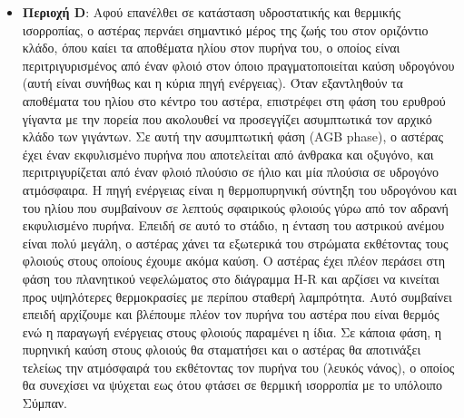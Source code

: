 \begin{itemize}
    \item \textbf{Περιοχή D}: Αφού επανέλθει σε κατάσταση υδροστατικής και θερμικής ισορροπίας, ο αστέρας περνάει σημαντικό μέρος της ζωής του στον οριζόντιο κλάδο, όπου καίει τα αποθέματα ηλίου στον πυρήνα του, ο οποίος είναι περιτριγυρισμένος από έναν φλοιό στον όποιο πραγματοποιείται καύση υδρογόνου (αυτή είναι συνήθως και η κύρια πηγή ενέργειας). Όταν εξαντληθούν τα αποθέματα του ηλίου στο κέντρο του αστέρα, επιστρέφει στη φάση του ερυθρού γίγαντα με την πορεία που ακολουθεί να προσεγγίζει ασυμπτωτικά τον αρχικό κλάδο των γιγάντων. Σε αυτή την ασυμπτωτική φάση (AGB phase), ο αστέρας έχει έναν εκφυλισμένο πυρήνα που αποτελείται από άνθρακα και οξυγόνο, και περιτριγυρίζεται από έναν φλοιό πλούσιο σε ήλιο και μία πλούσια σε υδρογόνο ατμόσφαιρα. Η πηγή ενέργειας είναι η θερμοπυρηνική σύντηξη του υδρογόνου και του ηλίου που συμβαίνουν σε λεπτούς σφαιρικούς φλοιούς γύρω από τον αδρανή εκφυλισμένο πυρήνα. 
    Επειδή σε αυτό το στάδιο, η ένταση του αστρικού ανέμου είναι πολύ μεγάλη, ο αστέρας χάνει τα εξωτερικά του στρώματα εκθέτοντας τους φλοιούς στους οποίους έχουμε ακόμα καύση. Ο αστέρας έχει πλέον περάσει στη φάση του πλανητικού νεφελώματος στο διάγραμμα H-R και αρζίσει να κινείται προς υψηλότερες θερμοκρασίες με περίπου σταθερή λαμπρότητα. Αυτό συμβαίνει επειδή αρχίζουμε και βλέπουμε πλέον τον πυρήνα του αστέρα που είναι θερμός ενώ η παραγωγή ενέργειας στους φλοιούς παραμένει η ίδια.
    Σε κάποια φάση, η πυρηνική καύση στους φλοιούς θα σταματήσει και ο αστέρας θα αποτινάξει τελείως την ατμόσφαιρά του εκθέτοντας τον πυρήνα του (λευκός νάνος), ο οποίος θα συνεχίσει να ψύχεται εως ότου φτάσει σε θερμική ισορροπία με το υπόλοιπο Σύμπαν.
\end{itemize}
